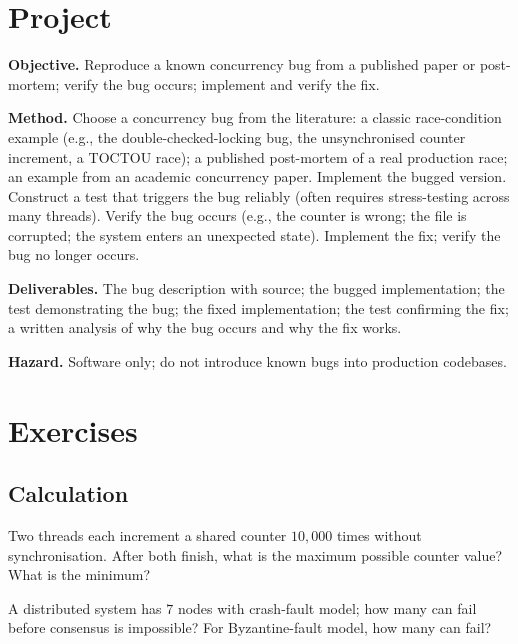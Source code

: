 \section{Project}

\begin{project}
\textbf{Objective.} Reproduce a known concurrency bug from a published paper or post-mortem; verify the bug occurs; implement and verify the fix.

\textbf{Method.} Choose a concurrency bug from the literature: a classic race-condition example (e.g., the double-checked-locking bug, the unsynchronised counter increment, a TOCTOU race); a published post-mortem of a real production race; an example from an academic concurrency paper. Implement the bugged version. Construct a test that triggers the bug reliably (often requires stress-testing across many threads). Verify the bug occurs (e.g., the counter is wrong; the file is corrupted; the system enters an unexpected state). Implement the fix; verify the bug no longer occurs.

\textbf{Deliverables.} The bug description with source; the bugged implementation; the test demonstrating the bug; the fixed implementation; the test confirming the fix; a written analysis of why the bug occurs and why the fix works.

\textbf{Hazard.} Software only; do not introduce known bugs into production codebases.
\end{project}

\section{Exercises}

\subsection*{Calculation}

\begin{exercise}
Two threads each increment a shared counter $10{,}000$ times without synchronisation. After both finish, what is the maximum possible counter value? What is the minimum?
\end{exercise}

\begin{exercise}
A distributed system has $7$ nodes with crash-fault model; how many can fail before consensus is impossible? For Byzantine-fault model, how many can fail?
\end{exercise}

